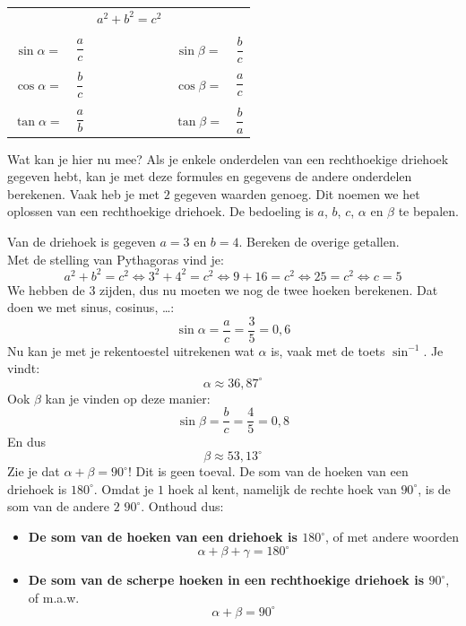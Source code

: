 \begin{center}
\begin{tabular}{ccccc}
&&$a^2+b^2=c^2$ &&\\
&&&&\\
$\sin \alpha=$ & $\dfrac{a}{c}$ &\qquad\qquad\qquad & $\sin \beta=$ & $\dfrac{b}{c}$\\
&&&&\\
$\cos \alpha=$ & $\dfrac{b}{c}$ &\qquad\qquad\qquad & $\cos \beta=$ & $\dfrac{a}{c}$\\
&&&&\\
$\tan \alpha=$ & $\dfrac{a}{b}$ &\qquad\qquad\qquad & $\tan \beta=$ & $\dfrac{b}{a}$\\
\end{tabular}
\end{center}

Wat kan je hier nu mee? Als je enkele onderdelen van een rechthoekige driehoek gegeven hebt, kan je met deze formules en gegevens de andere onderdelen berekenen. Vaak heb je met $2$ gegeven waarden genoeg. Dit noemen we het oplossen van een rechthoekige driehoek. De bedoeling is $a$, $b$, $c$, $\alpha$ en $\beta$ te bepalen.

\begin{voorbeeld}
	Van de driehoek is gegeven $a = 3$ en $b = 4$. Bereken de overige getallen.\\
Met de stelling van Pythagoras vind je:
\[a^2+b^2=c^2 \Leftrightarrow 3^2+4^2=c^2 \Leftrightarrow 9+16=c^2 \Leftrightarrow 25=c^2 \Leftrightarrow c=5\]
We hebben de $3$ zijden, dus nu moeten we nog de twee hoeken berekenen. Dat doen we met sinus, cosinus, \ldots:
\[\sin \alpha = \frac{a}{c} = \frac{3}{5} = 0,6\]
Nu kan je met je rekentoestel uitrekenen wat $\alpha$ is, vaak met de toets $\sin^{-1}$. Je vindt:
\[\alpha \approx 36,87^\circ\]
Ook $\beta$ kan je vinden op deze manier:
\[\sin \beta = \frac{b}{c}=\frac{4}{5}=0,8\]
En dus
\[\beta \approx 53,13^\circ\]
Zie je dat $\alpha+\beta = 90^\circ$! Dit is geen toeval. De som van de hoeken van een driehoek is $180^\circ$. Omdat je $1$ hoek al kent, namelijk de rechte hoek van $90^\circ$, is de som van de andere $2$ $90^\circ$. Onthoud dus:

\begin{itemize}
	\item \textbf{De som van de hoeken van een driehoek is $180^\circ$}, of met andere woorden
	\[\alpha+\beta+\gamma=180^\circ\]
	\item \textbf{De som van de scherpe hoeken in een rechthoekige driehoek is $90^\circ$}, of m.a.w.
	\[\alpha+\beta = 90^\circ\]
\end{itemize}

\end{voorbeeld}

